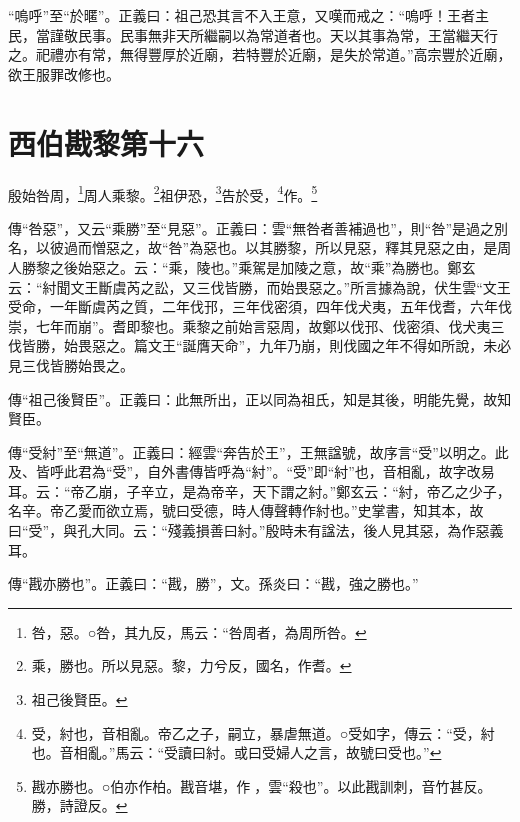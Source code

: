 {\noindent\shu{}\fzkt “嗚呼”至“於暱”。正義曰：祖己恐其言不入王意，又嘆而戒之：“嗚呼！王者主民，當謹敬民事。民事無非天所繼嗣以為常道者也。天以其事為常，王當繼天行之。祀禮亦有常，無得豐厚於近廟，若特豐於近廟，是失於常道。”高宗豐於近廟，欲王服罪改修也。 \par}

\section{西伯戡黎第十六}


殷始咎周，\footnote{咎，惡。○咎，其九反，馬云：“咎周者，為周所咎。}周人乘黎。\footnote{乘，勝也。所以見惡。黎，力兮反，國名，作耆。}祖伊恐，\footnote{祖己後賢臣。}告於受，\footnote{受，紂也，音相亂。帝乙之子，嗣立，暴虐無道。○受如字，傳云：“受，紂也。音相亂。”馬云：“受讀曰紂。或曰受婦人之言，故號曰受也。”}作。\footnote{戡亦勝也。○伯亦作柏。戡音堪，作𢦟，雲“殺也”。以此戡訓刺，音竹甚反。勝，詩證反。}

{\noindent\zhuan{}\fzbyks 傳“咎惡”，又云“乘勝”至“見惡”。正義曰：雲“無咎者善補過也”，則“咎”是過之別名，以彼過而憎惡之，故“咎”為惡也。以其勝黎，所以見惡，釋其見惡之由，是周人勝黎之後始惡之。云：“乘，陵也。”乘駕是加陵之意，故“乘”為勝也。鄭玄云：“紂聞文王斷虞芮之訟，又三伐皆勝，而始畏惡之。”所言據為說，伏生雲“文王受命，一年斷虞芮之質，二年伐邘，三年伐密須，四年伐犬夷，五年伐耆，六年伐崇，七年而崩”。耆即黎也。乘黎之前始言惡周，故鄭以伐邘、伐密須、伐犬夷三伐皆勝，始畏惡之。篇文王“誕膺天命”，九年乃崩，則伐國之年不得如所說，未必見三伐皆勝始畏之。 \par}

{\noindent\zhuan{}\fzbyks 傳“祖己後賢臣”。正義曰：此無所出，正以同為祖氏，知是其後，明能先覺，故知賢臣。 \par}

{\noindent\zhuan{}\fzbyks 傳“受紂”至“無道”。正義曰：經雲“奔告於王”，王無諡號，故序言“受”以明之。此及、皆呼此君為“受”，自外書傳皆呼為“紂”。“受”即“紂”也，音相亂，故字改易耳。云：“帝乙崩，子辛立，是為帝辛，天下謂之紂。”鄭玄云：“紂，帝乙之少子，名辛。帝乙愛而欲立焉，號曰受德，時人傳聲轉作紂也。”史掌書，知其本，故曰“受”，與孔大同。云：“殘義損善曰紂。”殷時未有諡法，後人見其惡，為作惡義耳。 \par}

{\noindent\zhuan{}\fzbyks 傳“戡亦勝也”。正義曰：“戡，勝”，文。孫炎曰：“戡，強之勝也。” \par}

